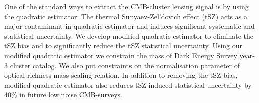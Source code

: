   
  One of the standard ways to extract the CMB-cluster lensing signal is by using the quadratic estimator. 
  The thermal Sunyaev-Zel'dovich effect (tSZ) acts as a major contaminant in quadratic estimator and induces significant systematic and statistical uncertainty.
   We develop modified quadratic estimator to eliminate the tSZ bias and to significantly reduce the tSZ statistical uncertainty.
  Using our modified quadratic estimator we constrain the mass of Dark Energy Survey year-3 cluster catalog. 
  We also put constraints on the normalisation parameter of optical richness-mass scaling relation. 
  In addition to removing the tSZ bias, modified quadratic estimator also reduces tSZ induced statistical uncertainty by 40\% in future low noise CMB-surveys.  
  
 
  
                                                                                                                                   
\vspace{4.0cm}                                                                                                                                  
                                                                                                                                                
                                                                                                                                                

